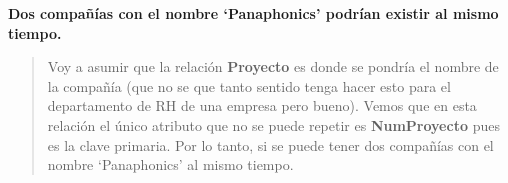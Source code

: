 \textbf{Dos compañías con el nombre ‘Panaphonics’ podrían existir al mismo tiempo.}\vspace{.3cm}

\begin{quote}
    Voy a asumir que la relación \textbf{Proyecto} es donde se pondría el nombre de la compañía (que no se que tanto sentido tenga hacer esto para el departamento de RH de una empresa pero bueno). Vemos que en esta relación el único atributo que no se puede repetir es \textbf{NumProyecto} pues es la clave primaria. Por lo tanto, si se puede tener dos compañías con el nombre ‘Panaphonics’ al mismo tiempo.
\end{quote}
\vspace{.3cm}